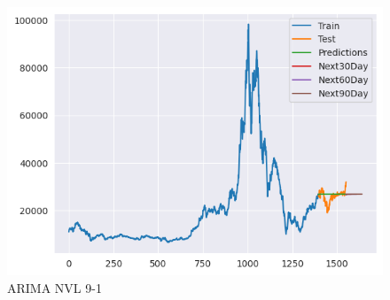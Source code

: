 \documentclass[conference]{IEEEtran}
\begin{document}
\begin{figure}[htbp]
\begin{minipage}{0.23\textwidth}
    \includegraphics[width=1\textwidth]{experiment/arima/DIG/9 _ 1/9_1_train_test_DIG_ARIMA_plot.png}
    \caption{ARIMA NVL 9-1}
    \label{fig:nvl_histogram}
    \end{minipage}
\end{figure}
\end{document}
